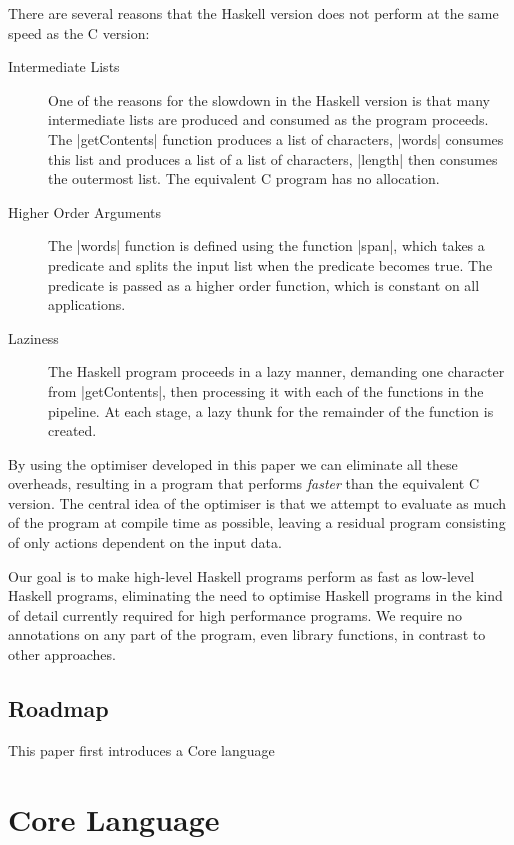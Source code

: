\documentclass{llncs}
\begin{document}
There are several reasons that the Haskell version does not perform at the same speed as the C version:

\begin{description}
\item[Intermediate Lists] One of the reasons for the slowdown in the Haskell version is that many intermediate lists are produced and consumed as the program proceeds. The |getContents| function produces a list of characters, |words| consumes this list and produces a list of a list of characters, |length| then consumes the outermost list. The equivalent C program has no allocation.
\item[Higher Order Arguments] The |words| function is defined using the function |span|, which takes a predicate and splits the input list when the predicate becomes true. The predicate is passed as a higher order function, which is constant on all applications.
\item[Laziness] The Haskell program proceeds in a lazy manner, demanding one character from |getContents|, then processing it with each of the functions in the pipeline. At each stage, a lazy thunk for the remainder of the function is created.
\end{description}

By using the optimiser developed in this paper we can eliminate all these overheads, resulting in a program that performs \textit{faster} than the equivalent C version. The central idea of the optimiser is that we attempt to evaluate as much of the program at compile time as possible, leaving a residual program consisting of only actions dependent on the input data.

Our goal is to make high-level Haskell programs perform as fast as low-level Haskell programs, eliminating the need to optimise Haskell programs in the kind of detail currently required for high performance programs. We require no annotations on any part of the program, even library functions, in contrast to other approaches.

\subsection{Roadmap}

This paper first introduces a Core language

\section{Core Language}
\end{document}
